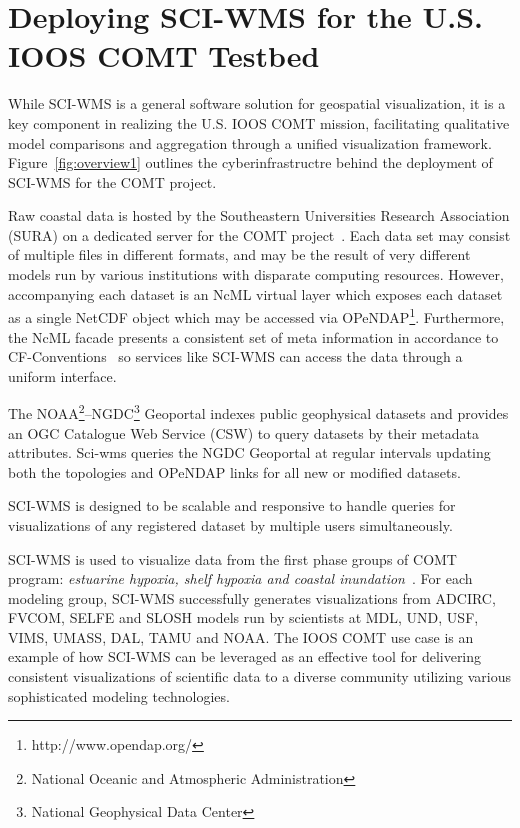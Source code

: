 \documentclass[11pt,twocolumn,twoside]{IEEEtran}
\newcommand{\comt}{COMT}
\newcommand{\ioos}{IOOS}
\newcommand{\sura}{SURA}
\newcommand{\ogc}{OGC}
\newcommand{\csw}{CSW}
\newcommand{\ncml}{NcML}
\newcommand{\noaa}{NOAA}
\newcommand{\ngdc}{NGDC}
\newcommand{\opendap}{OPeNDAP}
\newcommand{\netcdf}{NetCDF}
\newcommand{\sciwms}{SCI-WMS}
\newcommand{\Sciwms}{SCI-WMS}
\newcommand{\adcirc}{ADCIRC}
\newcommand{\fvcom}{FVCOM}
\newcommand{\selfe}{SELFE}
\newcommand{\slosh}{SLOSH}
\newcommand{\mdl}{MDL}
\newcommand{\und}{UND}
\newcommand{\usf}{USF}
\newcommand{\vims}{VIMS}
\newcommand{\umass}{UMASS}
\newcommand{\dal}{DAL}
\newcommand{\tamu}{TAMU}
\begin{document}
\section{Deploying \sciwms{} for the U.S. \ioos{} \comt{} Testbed}
While \sciwms{} is a general software solution for geospatial
visualization, it is a key component in realizing the U.S. \ioos{}
\comt{} mission, facilitating qualitative model comparisons and
aggregation through a unified visualization
framework. Figure~\ref{fig:overview1} outlines the cyberinfrastructre
behind the deployment of \sciwms{} for the \comt{} project.

Raw coastal data is hosted by the Southeastern Universities Research
Association (\sura{}) on a dedicated server for the \comt{}
project~\cite{luettich12}. Each data set may consist of multiple files
in different formats, and may be the result of very different models
run by various institutions with disparate computing
resources. However, accompanying each dataset is an \ncml{} virtual
layer which exposes each dataset as a single \netcdf{} object which
may be accessed via
\opendap{}\footnote{http://www.opendap.org/}. Furthermore, the \ncml{}
facade presents a consistent set of meta information in accordance to
CF-Conventions~\cite{cf} so services like \sciwms{} can access the
data through a uniform interface.

The \noaa{}\footnote{National Oceanic and Atmospheric Administration}--\ngdc{}\footnote{National Geophysical
Data Center} Geoportal indexes public geophysical datasets and provides an \ogc{} Catalogue Web Service (\csw{})
to query datasets by their metadata attributes. Sci-wms queries the \ngdc{} Geoportal at regular intervals
updating both the topologies and \opendap{} links for all new or modified datasets.

\sciwms{} is designed to be scalable and responsive to handle queries for visualizations of
any registered dataset by multiple users simultaneously.

\Sciwms{} is used to visualize data from the first phase groups
of \comt{} program: {\em estuarine hypoxia, shelf hypoxia and coastal
 inundation}~\cite{luettich13}. For each modeling group,
\sciwms{} successfully generates visualizations from
\adcirc{}, \fvcom{}, \selfe{} and \slosh{} models run by scientists at
\mdl{}, \und{}, \usf{}, \vims{}, \umass{}, \dal{}, \tamu{} and
\noaa{}. The \ioos{} \comt{} use case is an example of how \sciwms{}
can be leveraged as an effective tool for delivering consistent
visualizations of scientific data to a diverse community utilizing
various sophisticated modeling technologies.
\end{document}
